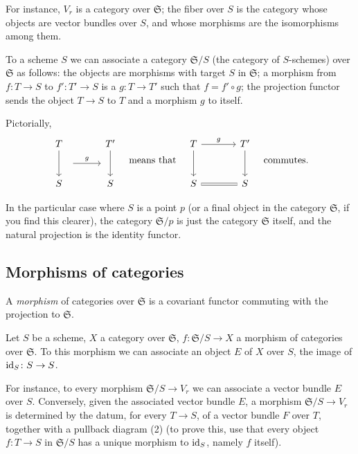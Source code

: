 \documentclass[12pt]{memoir}
\begin{document}
For instance, $V_r$ is a category over $\mathfrak{S}$; the fiber over $S$ is the category whose objects are vector bundles over $S$, and whose morphisms are the isomorphisms among them.

To a scheme $S$ we can associate a category $\mathfrak{S}/S$ (the category of $S$-schemes) over $\mathfrak{S}$ as follows: the objects are morphisms with target $S$ in $\mathfrak{S}$; a morphism from $f\colon T \to S$ to $f'\colon T' \to S$ is a $g\colon T \to T'$ such that $f = f' \circ g$; the projection functor sends the object $T \to S$ to $T$ and a morphism $g$ to itself.

Pictorially,
$$
\begin{tikzcd}[row sep=large, column sep=large]
T \arrow[d, ""{name=L}] & T' \arrow[d, ""{name=R}] \\
S & S
\arrow[from=L, to=R, "g", shorten <=1em, shorten >=1em]
\end{tikzcd}
\quad\text{means that}\quad
\begin{tikzcd}[row sep=large, column sep=large]
T \arrow[r, "g"] \arrow[d] & T' \arrow[d] \\
S \arrow[r, equal] & S
\end{tikzcd}
\quad\text{commutes.}
$$

In the particular case where $S$ is a point $p$ (or a final object in the category $\mathfrak{S}$, if you find this clearer), the category $\mathfrak{S}/p$ is just the category $\mathfrak{S}$ itself, and the natural projection is the identity functor.

\subsection{Morphisms of categories}

A \emph{morphism} of categories over $\mathfrak{S}$ is a covariant functor commuting with the projection to $\mathfrak{S}$.

Let $S$ be a scheme, $X$ a category over $\mathfrak{S}$, $f\colon \mathfrak{S}/S \to X$ a morphism of categories over $\mathfrak{S}$. To this morphism we can associate an object $E$ of $X$ over $S$, the image of $\operatorname{id}_S\colon S \to S$.

For instance, to every morphism $\mathfrak{S}/S \to V_r$ we can associate a vector bundle $E$ over $S$. Conversely, given the associated vector bundle $E$, a morphism $\mathfrak{S}/S \to V_r$ is determined by the datum, for every $T \to S$, of a vector bundle $F$ over $T$, together with a pullback diagram (2) (to prove this, use that every object $f\colon T \to S$ in $\mathfrak{S}/S$ has a unique morphism to $\operatorname{id}_S$, namely $f$ itself).
\end{document}
